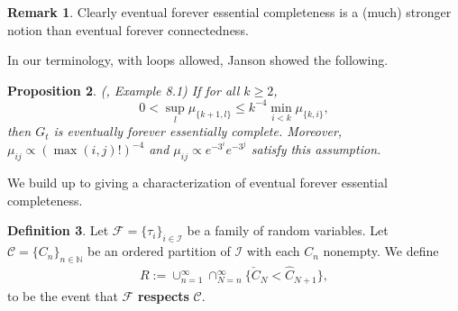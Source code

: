 \documentclass[12pt]{article}
\newtheorem{proposition}{Proposition}
\theoremstyle{definition}
\newtheorem{definition}[proposition]{Definition}
\newtheorem{remark}[proposition]{Remark}
\begin{document}
\begin{remark}
    Clearly eventual forever essential completeness is a (much) stronger notion than eventual forever connectedness.
\end{remark}
In our terminology, with loops allowed, Janson \cite{janson_2017_on} showed the following.
\begin{proposition}(\cite{janson_2017_on}, Example 8.1) \label{complete sufficient} If for all $k \geq 2$,
$$0 < \sup_{l}\mu_{\{k+1,l\}} \leq k^{-4}\min_{i<k}\mu_{\{k,i\}},$$ then $G_t$ is eventually forever essentially complete. Moreover, $\mu_{ij} \propto (\max(i,j)!)^{-4}$ and $\mu_{ij} \propto e^{-3^i}e^{-3^j}$ satisfy this assumption.
\end{proposition}
We build up to giving a characterization of eventual forever essential completeness.
\begin{definition}
Let $\mathcal{F} =\{\tau_i\}_{i \in \mathcal{I}}$ be a family of random variables. Let $\mathcal{C} =\{C_n\}_{n \in \mathbb{N}}$ be an ordered partition of $\mathcal{I}$ with each $C_n$ nonempty. We define
\begin{align*}
    R := \cup_{n = 1}^\infty \cap_{N=n}^\infty \{\check{C}_N < \hat{C}_{N+1}\},
\end{align*} to be the event that $\mathcal{F}$ \textbf{respects} $\mathcal{C}$.
\end{definition}
\end{document}
